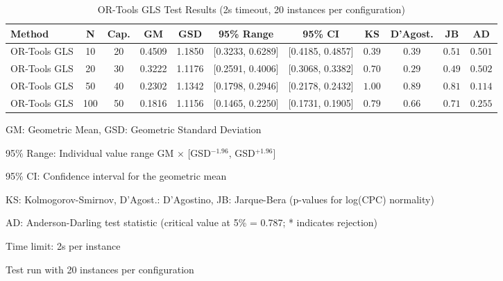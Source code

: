 \begin{table*}[htbp]
\centering
\caption{OR-Tools GLS Test Results (2s timeout, 20 instances per configuration)}
\label{tab:ortools-gls-2s}
\begin{tabular}{@{}l c c S[table-format=1.4] S[table-format=1.4] c c c c c c@{}}
\toprule
\textbf{Method} & \textbf{N} & \textbf{Cap.} & {\textbf{GM}} & {\textbf{GSD}} & 
\textbf{95\% Range} & \textbf{95\% CI} & \textbf{KS} & \textbf{D'Agost.} & \textbf{JB} & \textbf{AD} \\
\midrule
OR-Tools GLS & 10 & 20 & 0.4509 & 1.1850 & [0.3233, 0.6289] & [0.4185, 0.4857] & $0.39$ & $0.39$ & $0.51$ & $0.501$ \\
OR-Tools GLS & 20 & 30 & 0.3222 & 1.1176 & [0.2591, 0.4006] & [0.3068, 0.3382] & $0.70$ & $0.29$ & $0.49$ & $0.502$ \\
OR-Tools GLS & 50 & 40 & 0.2302 & 1.1342 & [0.1798, 0.2946] & [0.2178, 0.2432] & $1.00$ & $0.89$ & $0.81$ & $0.114$ \\
OR-Tools GLS & 100 & 50 & 0.1816 & 1.1156 & [0.1465, 0.2250] & [0.1731, 0.1905] & $0.79$ & $0.66$ & $0.71$ & $0.255$ \\
\bottomrule
\end{tabular}
\begin{tablenotes}
\small
\item GM: Geometric Mean, GSD: Geometric Standard Deviation
\item 95\% Range: Individual value range GM $\times$ [GSD$^{-1.96}$, GSD$^{+1.96}$]
\item 95\% CI: Confidence interval for the geometric mean
\item KS: Kolmogorov-Smirnov, D'Agost.: D'Agostino, JB: Jarque-Bera (p-values for log(CPC) normality)
\item AD: Anderson-Darling test statistic (critical value at 5\% = 0.787; * indicates rejection)
\item Time limit: 2s per instance
\item Test run with 20 instances per configuration
\end{tablenotes}
\end{table*}